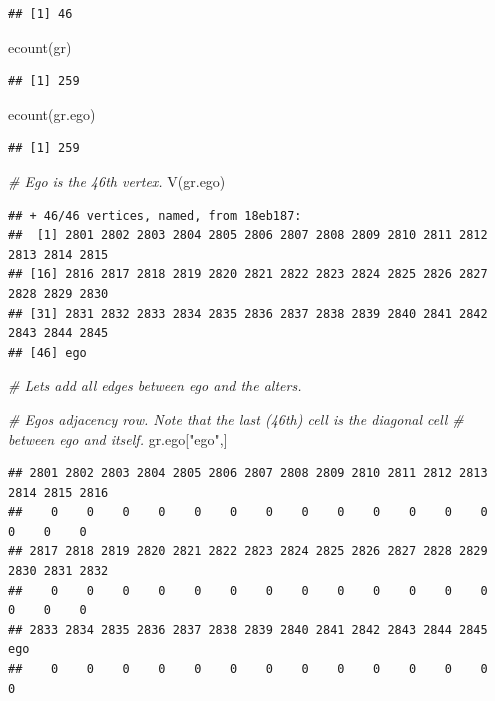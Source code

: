 \documentclass[
]{book}
\newenvironment{Shaded}{\begin{snugshade}}{\end{snugshade}}
\newcommand{\CommentTok}[1]{\textcolor[rgb]{0.56,0.35,0.01}{\textit{#1}}}
\newcommand{\FunctionTok}[1]{\textcolor[rgb]{0.00,0.00,0.00}{#1}}
\newcommand{\NormalTok}[1]{#1}
\newcommand{\StringTok}[1]{\textcolor[rgb]{0.31,0.60,0.02}{#1}}
\begin{document}
\begin{verbatim}
## [1] 46
\end{verbatim}

\begin{Shaded}
\begin{Highlighting}[]
\FunctionTok{ecount}\NormalTok{(gr)}
\end{Highlighting}
\end{Shaded}

\begin{verbatim}
## [1] 259
\end{verbatim}

\begin{Shaded}
\begin{Highlighting}[]
\FunctionTok{ecount}\NormalTok{(gr.ego)}
\end{Highlighting}
\end{Shaded}

\begin{verbatim}
## [1] 259
\end{verbatim}

\begin{Shaded}
\begin{Highlighting}[]
\CommentTok{\# Ego is the 46th vertex.}
\FunctionTok{V}\NormalTok{(gr.ego)}
\end{Highlighting}
\end{Shaded}

\begin{verbatim}
## + 46/46 vertices, named, from 18eb187:
##  [1] 2801 2802 2803 2804 2805 2806 2807 2808 2809 2810 2811 2812 2813 2814 2815
## [16] 2816 2817 2818 2819 2820 2821 2822 2823 2824 2825 2826 2827 2828 2829 2830
## [31] 2831 2832 2833 2834 2835 2836 2837 2838 2839 2840 2841 2842 2843 2844 2845
## [46] ego
\end{verbatim}

\begin{Shaded}
\begin{Highlighting}[]
\CommentTok{\# Let\textquotesingle{}s add all edges between ego and the alters.}

\CommentTok{\# Ego\textquotesingle{}s adjacency row. Note that the last (46th) cell is the diagonal cell}
\CommentTok{\# between ego and itself.}
\NormalTok{gr.ego[}\StringTok{"ego"}\NormalTok{,]}
\end{Highlighting}
\end{Shaded}

\begin{verbatim}
## 2801 2802 2803 2804 2805 2806 2807 2808 2809 2810 2811 2812 2813 2814 2815 2816 
##    0    0    0    0    0    0    0    0    0    0    0    0    0    0    0    0 
## 2817 2818 2819 2820 2821 2822 2823 2824 2825 2826 2827 2828 2829 2830 2831 2832 
##    0    0    0    0    0    0    0    0    0    0    0    0    0    0    0    0 
## 2833 2834 2835 2836 2837 2838 2839 2840 2841 2842 2843 2844 2845  ego 
##    0    0    0    0    0    0    0    0    0    0    0    0    0    0
\end{verbatim}
\end{document}
